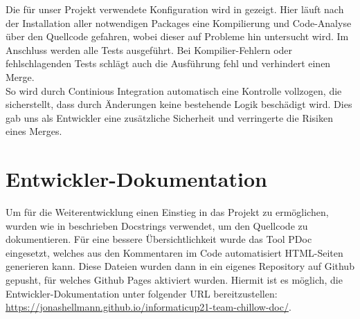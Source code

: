 Die für unser Projekt verwendete Konfiguration wird in  gezeigt.
Hier läuft nach der Installation aller notwendigen Packages eine Kompilierung und Code-Analyse über den
Quellcode gefahren, wobei dieser auf Probleme hin untersucht wird.
Im Anschluss werden alle Tests ausgeführt.
Bei Kompilier-Fehlern oder fehlschlagenden Tests schlägt auch die Ausführung fehl und verhindert einen Merge. \\

So wird durch Continious Integration automatisch eine Kontrolle vollzogen, die sicherstellt, dass durch Änderungen
keine bestehende Logik beschädigt wird.
Dies gab uns als Entwickler eine zusätzliche Sicherheit und verringerte die Risiken eines Merges.

\section{Entwickler-Dokumentation}
\label{sec:entwickler-doku}

Um für die Weiterentwicklung einen Einstieg in das Projekt zu ermöglichen, wurden wie in
 beschrieben Docstrings verwendet, um den Quellcode zu dokumentieren.
Für eine bessere Übersichtlichkeit wurde das Tool PDoc eingesetzt, welches aus den Kommentaren im Code automatisiert
HTML-Seiten generieren kann. 
Diese Dateien wurden dann in ein eigenes Repository auf Github gepusht, für welches Github Pages 
aktiviert wurden.
Hiermit ist es möglich, die Entwickler-Dokumentation unter folgender URL bereitzustellen:
\url{https://jonashellmann.github.io/informaticup21-team-chillow-doc/}.
